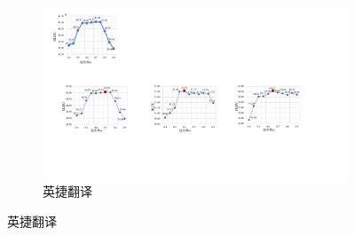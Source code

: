 \begin{figure}[!htbp]
\begin{subfigure}[b]{0.5\textwidth}
      \includegraphics[width=\textwidth]{Img/fig_4_searchw_encs.pdf}
      \caption{英捷翻译}
      \label{fig:4_searchw_encs}
    \end{subfigure}%
    \label{fig:4_searchw}
\end{figure}